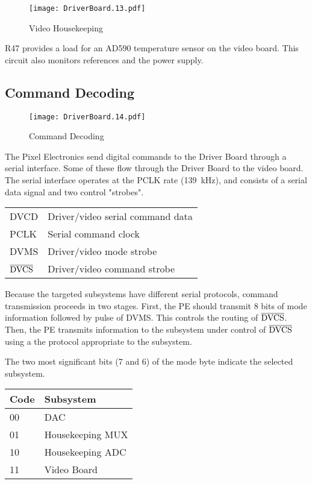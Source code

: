\documentclass[a4paper,12pt]{article}
\begin{document}
   \begin{figure}
   \begin{center}
   \texttt{[image: DriverBoard.13.pdf]}
   \end{center}
   \caption{Video Housekeeping}
   \end{figure}


R47 provides a load for an AD590 temperature sensor on the video board. This circuit also monitors references and the power supply.

\subsection{Command Decoding}
   \begin{figure}
   \begin{center}
   \texttt{[image: DriverBoard.14.pdf]}
   \end{center}
   \caption{Command Decoding}
   \end{figure}

The Pixel Electronics send digital commands to the Driver Board through a serial interface. Some of these flow through the Driver Board to the video board. The serial interface operates at the PCLK rate (139\ kHz), and consists of a serial data signal and two control "strobes".

\begin{tabular}{ll}
DVCD & Driver/video serial command data \\
PCLK & Serial command clock \\
DVMS & Driver/video mode strobe \\
$\overline{\textup{DVCS}}$ & Driver/video command strobe \\
\end{tabular}

Because the targeted subsystems have different serial protocols, command transmission proceeds in two stages. First, the PE should transmit 8 bits of mode information followed by pulse of DVMS. This controls the routing of $\overline{\textup{DVCS}}$. Then, the PE transmits information to the subsystem under control of $\overline{\textup{DVCS}}$ using a the protocol appropriate to the subsystem.

The two most significant bits (7 and 6) of the mode byte indicate the selected subsystem.

\begin{tabular}{|l|l|}
\hline
Code & Subsystem \\
\hline
00 & DAC \\
\hline
01 & Housekeeping MUX \\
\hline
10 & Housekeeping ADC \\
\hline
11 & Video Board \\
\hline
\end{tabular}
\end{document}
